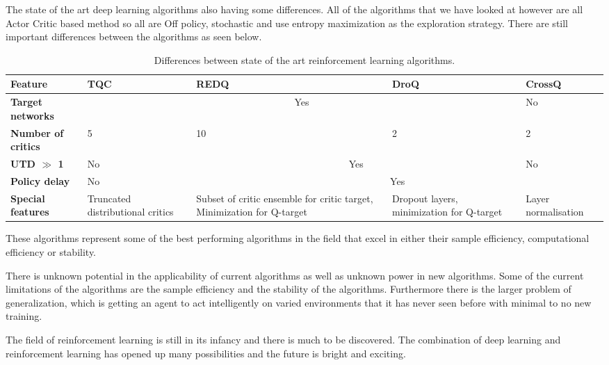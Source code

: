 The state of the art deep learning algorithms also having some differences. All of the algorithms that we have looked at however are all Actor Critic based method so all are Off policy, stochastic and use entropy maximization as the exploration strategy. There are still important differences between the algorithms as seen below.

\begin{table}[H]
    \footnotesize
    \centering
    \renewcommand{\arraystretch}{1.4} %
    \begin{tabularx}{\textwidth}{X X X X X}
        \hline
        \textbf{Feature} & \textbf{TQC} & \textbf{REDQ} & \textbf{DroQ} & \textbf{CrossQ} \\
        \hline
        \textbf{Target networks} & \multicolumn{3}{c}{Yes} & No \\
        \textbf{Number of critics} & 5 & 10 & 2 & 2 \\
        \textbf{UTD $\gg$ 1} & No & \multicolumn{2}{c}{Yes} & No \\
        \textbf{Policy delay} & No & \multicolumn{3}{c}{Yes} \\
        \textbf{Special features} & Truncated distributional critics  & Subset of critic ensemble for critic target, Minimization for Q-target & Dropout layers, minimization for Q-target & Layer normalisation \\
        \hline
    \end{tabularx}
    \caption{Differences between state of the art reinforcement learning algorithms.}
\end{table}

These algorithms represent some of the best performing algorithms in the field that excel in either their sample efficiency, computational efficiency or stability.

There is unknown potential in the applicability of current algorithms as well as unknown power in new algorithms. Some of the current limitations of the algorithms are the sample efficiency and the stability of the algorithms. Furthermore there is the larger problem of generalization, which is getting an agent to act intelligently on varied environments that it has never seen before with minimal to no new training.

The field of reinforcement learning is still in its infancy and there is much to be discovered. The combination of deep learning and reinforcement learning has opened up many possibilities and the future is bright and exciting.